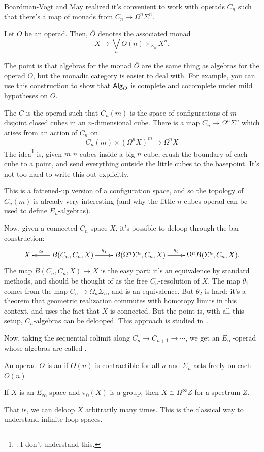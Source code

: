 Boardman-Vogt and May realized it's convenient to work with operads $C_n$ such that there's a map of monads from
$\overline C_n\to\Omega^n\Sigma^n$.
\begin{defn}
Let $O$ be an operad. Then, $\overline O$ denotes the associated monad
\[X\mapsto\bigvee_n O(n)\times_{\Sigma_n} X^n.\]
\end{defn}
The point is that algebras for the monad $\overline O$ are the same thing as algebras for the operad $O$, but the
monadic category is easier to deal with. For example, you can use this construction to show that $\mathsf{Alg}_O$ is
complete and cocomplete under mild hypotheses on $O$.
\begin{exm}
The  $C$ is the operad such that $C_n(m)$ is the space of configurations of $m$
disjoint closed cubes in an $n$-dimensional cube. There is a map $\overline C_n\to\Omega^n\Sigma^n$ which arises
from an action of $\overline C_n$ on
\[C_n(m)\times (\Omega^n X)^m\to \Omega^n X\]
The idea\footnote{\TODO: I don't understand this.} is, given $m$ $n$-cubes inside a big $n$-cube, crush the
boundary of each cube to a point, and send everything outside the little cubes to the basepoint. It's not too hard
to write this out explicitly.
\end{exm}
This is a fattened-up version of a configuration space, and so the topology of $C_n(m)$ is already very interesting
(and why the little $n$-cubes operad can be used to define $E_n$-algebras).

Now, given a connected $C_n$-space $X$, it's possible to deloop through the bar construction:
\[\xymatrix{
	X & B(C_n,C_n,X)\ar[l]_-\simeq\ar[r]^-{\theta_1} & B(\Omega^n\Sigma^n, C_n, X)\ar[r]^-{\theta_2} &\Omega^n
	B(\Sigma^n, C_n, X).
}\]
The map $B(C_n,C_n, X)\to X$ is the easy part: it's an equivalence by standard methods, and should be thought of as
the free $C_n$-resolution of $X$. The map $\theta_1$ comes from the map $C_n\to\Omega_n\Sigma_n$, and is an
equivalence. But $\theta_2$ is hard: it's a theorem that geometric realization commutes with homotopy limits in
this context, and uses the fact that $X$ is connected. But the point is, with all this setup, $C_n$-algebras can be
delooped. This approach is studied in~\cite{MayGILS}.

Now, taking the sequential colimit along $C_n\to C_{n+1}\to\dotsb$, we get an $E_\infty$-operad whose algebras are
called .
\begin{defn}
An operad $O$ is an  if $O(n)$ is contractible for all $n$ and $\Sigma_n$ acts freely on
each $O(n)$.
\end{defn}
\begin{thm}
If $X$ is an $E_\infty$-space and $\pi_0(X)$ is a group, then $X\cong\Omega^\infty Z$ for a spectrum $Z$.
\end{thm}
That is, we can deloop $X$ arbitrarily many times. This is the classical way to understand infinite loop spaces.


